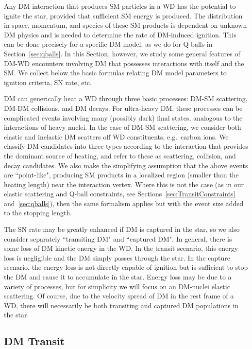 
Any DM interaction that produces SM particles in a WD has the potential to ignite the star, provided that sufficient SM energy is produced.
The distribution in space, momentum, and species of these SM products is dependent on unknown DM physics and is needed to determine the rate of DM-induced ignition.
This can be done precisely for a specific DM model, as we do for Q-balls in Section~\ref{sec:qballs}.
In this Section, however, we study some general features of DM-WD encounters involving DM that possesses interactions with itself and the SM.
We collect below the basic formulas relating DM model parameters to ignition criteria, SN rate, etc.

DM can generically heat a WD through three basic processes: DM-SM scattering, DM-DM collisions, and DM decays.
For ultra-heavy DM, these processes can be complicated events involving many (possibly dark) final states, analogous to the interactions of heavy nuclei.
In the case of DM-SM scattering, we consider both elastic and inelastic DM scatters off WD constituents, e.g.~carbon ions.
We classify DM candidates into three types according to the interaction that provides the dominant source of heating, and refer to these as scattering, collision, and decay candidates.
We also make the simplifying assumption that the above events are ``point-like", producing SM products in a localized region (smaller than the heating length) near the interaction vertex.
Where this is not the case (as in our elastic scattering and Q-ball constraints, see Sections~\ref{sec:TransitConstraints} and~\ref{sec:qballs}), then the same formalism applies but with the event size added to the stopping length.

The SN rate may be greatly enhanced if DM is captured in the star, so we also consider separately ``transiting DM" and ``captured DM".
In general, there is some loss of DM kinetic energy in the WD.
In the transit scenario, this energy loss is negligible and the DM simply passes through the star.
In the capture scenario, the energy loss is not directly capable of ignition but is sufficient to stop the DM and cause it to accumulate in the star.
Energy loss may be due to a variety of processes, but for simplicity we will focus on an DM-nuclei elastic scattering.
Of course, due to the velocity spread of DM in the rest frame of a WD, there will necessarily be both transiting and captured DM populations in the star.

\subsection{DM Transit}

